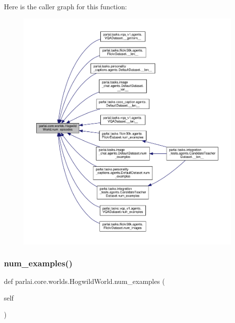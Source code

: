 Here is the caller graph for this function\+:
\nopagebreak
\begin{figure}[H]
\begin{center}
\leavevmode
\includegraphics[width=350pt]{classparlai_1_1core_1_1worlds_1_1HogwildWorld_ae0b4dc3d2bb4d1dbda7970da03da1a6e_icgraph}
\end{center}
\end{figure}
\mbox{\label{classparlai_1_1core_1_1worlds_1_1HogwildWorld_ae488971481ec6c8ba803b2404ad70e56}} 
\subsubsection{\texorpdfstring{num\+\_\+examples()}{num\_examples()}}
{\footnotesize\ttfamily def parlai.\+core.\+worlds.\+Hogwild\+World.\+num\+\_\+examples (\begin{DoxyParamCaption}\item[{}]{self }\end{DoxyParamCaption})}

